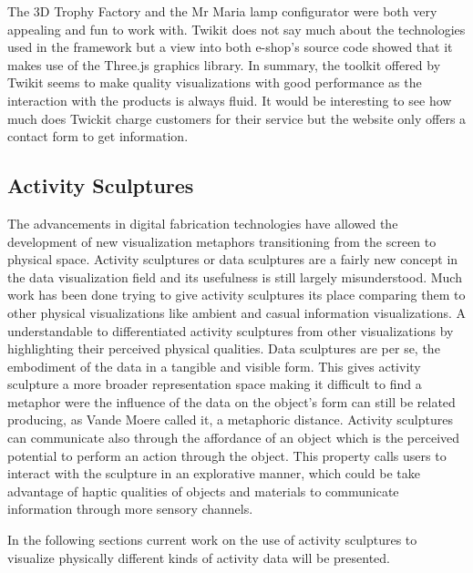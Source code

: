 \documentclass[../medieninformatik-arbeit.tex]{subfiles}
\begin{document}
The 3D Trophy Factory and the Mr Maria lamp configurator were both very appealing and fun to work with. Twikit does not say much about the technologies used in the framework but a view into both e-shop's source code showed that it makes use of the Three.js\cite{cabello2010three} graphics library. In summary, the toolkit offered by Twikit seems to make quality visualizations with good performance as the interaction with the products is always fluid. It would be interesting to see how much does Twickit charge customers for their service but the website only offers a contact form to get information.    

\subsection{Activity Sculptures}
\label{sec:activitysculptures}
The advancements in digital fabrication technologies have allowed the development of new visualization metaphors transitioning from the screen to physical space. Activity sculptures or data sculptures are a fairly new concept in the data visualization field and its usefulness is still largely misunderstood. Much work has been done trying to give activity sculptures its place comparing them to other physical visualizations like ambient and casual information visualizations\cite{jansen2013evaluating}. A understandable to differentiated activity sculptures from other visualizations by highlighting their perceived physical qualities\cite{vande2009analyzing,zhao2008embodiment}. Data sculptures are per se, the embodiment of the data in a tangible and visible form\cite{zhao2008embodiment}. This gives activity sculpture a more broader representation space making it difficult to find a metaphor were the influence of the data on the object's form can still be related producing, as Vande Moere called it, a metaphoric distance\cite{vande2009analyzing}. Activity sculptures can communicate also through the affordance of an object which is the perceived potential to perform an action through the object. This property calls users to interact with the sculpture in an explorative manner\cite{jansen2013evaluating,vande2008beyond}, which could be take advantage of haptic qualities of objects and materials to communicate information through more sensory channels\cite{bara2004visuo}. 

In the following sections current work on the use of activity sculptures to visualize physically different kinds of activity data will be presented. 
\end{document}
